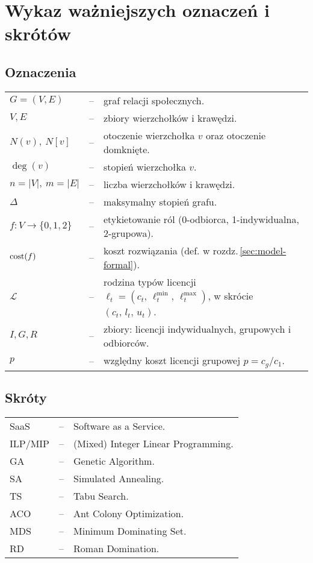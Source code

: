 \chapter*{Wykaz ważniejszych oznaczeń i skrótów}

\section*{Oznaczenia}

\begin{tabular}{@{} l l p{} @{}}
    $G=(V,E)$    & -- & graf relacji społecznych. \\
    $V,E$        & -- & zbiory wierzchołków i krawędzi. \\
    $N(v),\ N[v]$ & -- & otoczenie wierzchołka $v$ oraz otoczenie domknięte. \\
    $\deg(v)$    & -- & stopień wierzchołka $v$. \\
    $n=|V|,\ m=|E|$ & -- & liczba wierzchołków i krawędzi. \\
    $\Delta$     & -- & maksymalny stopień grafu. \\
    $f:V\to\{0,1,2\}$ & -- & etykietowanie ról (0-odbiorca, 1-indywidualna, 2-grupowa). \\
    $\operatorname{cost}(f)$   & -- & koszt rozwiązania (def. w rozdz.\,\ref{sec:model-formal}). \\
    $\mathcal{L}$ & -- & rodzina typów licencji $\ell_t=(c_t,\,\ell^{\min}_t,\,\ell^{\max}_t)$, w skrócie $(c_t,\,l_t,\,u_t)$. \\
    $I,G,R$      & -- & zbiory: licencji indywidualnych, grupowych i odbiorców. \\
    $p$          & -- & względny koszt licencji grupowej $p=c_g/c_1$. \\
\end{tabular}

\section*{Skróty}

\begin{tabular}{@{} l l p{} @{}}
    SaaS & -- & Software as a Service. \\
    ILP/MIP & -- & (Mixed) Integer Linear Programming. \\
    GA   & -- & Genetic Algorithm. \\
    SA   & -- & Simulated Annealing. \\
    TS   & -- & Tabu Search. \\
    ACO  & -- & Ant Colony Optimization. \\
    MDS  & -- & Minimum Dominating Set. \\
    RD   & -- & Roman Domination. \\
\end{tabular}
